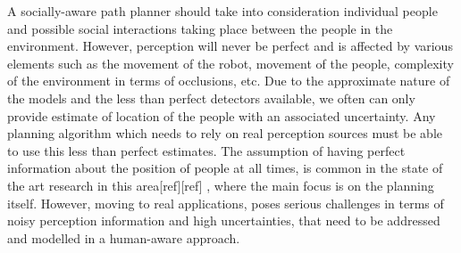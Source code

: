 

A socially-aware path planner should take into consideration individual people and possible social interactions taking place between the people in the environment. However, perception will never be perfect and is affected by various elements such as the movement of the robot, movement of the people, complexity of the environment in terms of occlusions, etc. Due to the approximate nature of the models and the less than perfect detectors available, we often can only provide estimate of location of the people with an associated uncertainty. Any planning algorithm which needs to rely on real perception sources must be able to use this less than perfect estimates. The assumption of having perfect information about the position of people at all times, is common in the state of the art research in this area[ref][ref] , where the main focus is on the planning itself. However, moving to real applications, poses serious challenges in terms of noisy perception information and high uncertainties, that need to be addressed and modelled in a human-aware approach.


